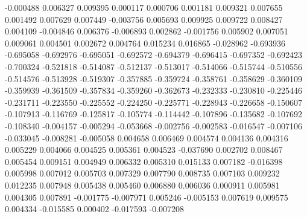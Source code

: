 -0.000488
0.006327
0.009395
0.000117
0.000706
0.001181
0.009321
0.007655
0.001492
0.007629
0.007449
-0.003756
0.005693
0.009925
0.009722
0.008427
0.004109
-0.004846
0.006376
-0.006893
0.002862
-0.001756
0.005902
0.007051
0.009061
0.004501
0.002672
0.004764
0.015234
0.016865
-0.028962
-0.693936
-0.695058
-0.692976
-0.695051
-0.692572
-0.694379
-0.696415
-0.697352
-0.692423
-0.700324
-0.521818
-0.514087
-0.512137
-0.513017
-0.514066
-0.515744
-0.510556
-0.514576
-0.513928
-0.519307
-0.357885
-0.359724
-0.358761
-0.358629
-0.360109
-0.359939
-0.361509
-0.357834
-0.359260
-0.362673
-0.232333
-0.230810
-0.225446
-0.231711
-0.223550
-0.225552
-0.224250
-0.225771
-0.228943
-0.226658
-0.150607
-0.107913
-0.116769
-0.125817
-0.105774
-0.114442
-0.107896
-0.135682
-0.107692
-0.108340
-0.004157
-0.005294
-0.053668
-0.002756
-0.002583
-0.016547
-0.007106
-0.033045
-0.008281
-0.005058
0.004658
0.006469
0.004574
0.004136
0.004316
0.005229
0.004066
0.004525
0.005361
0.004523
-0.037690
0.002702
0.008467
0.005454
0.009151
0.004949
0.006332
0.005310
0.015133
0.007182
-0.016398
0.005998
0.007012
0.005703
0.007329
0.007790
0.008735
0.007103
0.009232
0.012235
0.007948
0.005438
0.005460
0.006880
0.006036
0.000911
0.005981
0.004305
0.007891
-0.001775
-0.007971
0.005246
-0.005153
0.007619
0.009575
0.004334
-0.015585
0.000402
-0.017593
-0.007208
